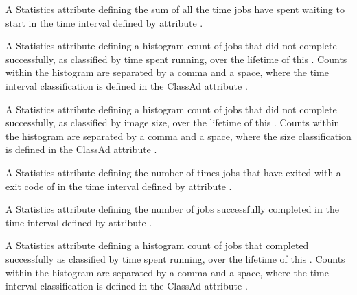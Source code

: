 \begin{description}
\item[\AdAttr{JobsAccumTimeToStart}:] A Statistics attribute defining
  the sum of all the time jobs have spent waiting to start
  in the time interval defined by attribute .

\item[\AdAttr{JobsBadputRuntimes}:] A Statistics attribute defining
  a histogram count of jobs that did not complete successfully, 
  as classified by time spent running,
  over the lifetime of this .
  Counts within the histogram are separated by a comma and a space, 
  where the time interval classification is defined in the ClassAd attribute
  .

\item[\AdAttr{JobsBadputSizes}:] A Statistics attribute defining
  a histogram count of jobs that did not complete successfully,
  as classified by image size,
  over the lifetime of this .
  Counts within the histogram are separated by a comma and a space, 
  where the size classification is defined in the ClassAd attribute
  .

\item[\AdAttr{JobsCheckpointed}:] A Statistics attribute defining
  the number of times jobs that have exited 
  with a  exit code of 
  in the time interval defined by attribute .

\item[\AdAttr{JobsCompleted}:] A Statistics attribute defining
  the number of jobs successfully completed
  in the time interval defined by attribute .

\item[\AdAttr{JobsCompletedRuntimes}:] A Statistics attribute defining
  a histogram count of jobs that completed successfully 
  as classified by time spent running,
  over the lifetime of this .
  Counts within the histogram are separated by a comma and a space, 
  where the time interval classification is defined in the ClassAd attribute
  .


\end{description}
